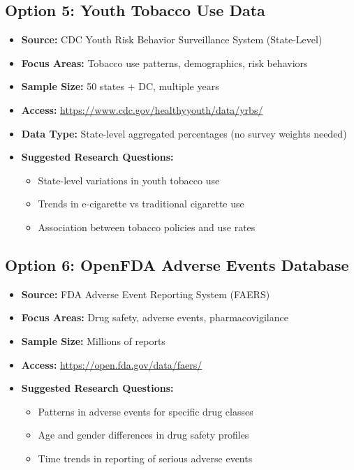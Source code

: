 \documentclass[11pt]{article}
\begin{document}
\subsection{Option 5: Youth Tobacco Use Data}
\begin{itemize}
\item \textbf{Source:} CDC Youth Risk Behavior Surveillance System (State-Level)
\item \textbf{Focus Areas:} Tobacco use patterns, demographics, risk behaviors
\item \textbf{Sample Size:} 50 states + DC, multiple years
\item \textbf{Access:} \url{https://www.cdc.gov/healthyyouth/data/yrbs/}
\item \textbf{Data Type:} State-level aggregated percentages (no survey weights needed)
\item \textbf{Suggested Research Questions:}
    \begin{itemize}
    \item State-level variations in youth tobacco use
    \item Trends in e-cigarette vs traditional cigarette use
    \item Association between tobacco policies and use rates
    \end{itemize}
\end{itemize}

\subsection{Option 6: OpenFDA Adverse Events Database}
\begin{itemize}
\item \textbf{Source:} FDA Adverse Event Reporting System (FAERS)
\item \textbf{Focus Areas:} Drug safety, adverse events, pharmacovigilance
\item \textbf{Sample Size:} Millions of reports
\item \textbf{Access:} \url{https://open.fda.gov/data/faers/}
\item \textbf{Suggested Research Questions:}
    \begin{itemize}
    \item Patterns in adverse events for specific drug classes
    \item Age and gender differences in drug safety profiles
    \item Time trends in reporting of serious adverse events
    \end{itemize}
\end{itemize}
\end{document}

